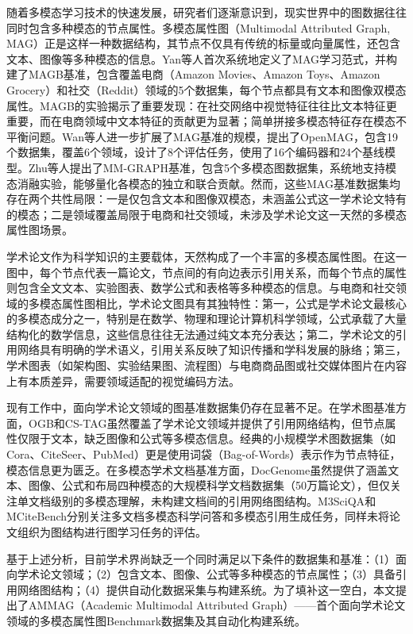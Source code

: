 随着多模态学习技术的快速发展\cite{baltruvsaitis2019multimodal}，研究者们逐渐意识到，现实世界中的图数据往往同时包含多种模态的节点属性。多模态属性图（Multimodal Attributed Graph, MAG）正是这样一种数据结构，其节点不仅具有传统的标量或向量属性，还包含文本、图像等多种模态的信息。Yan等人\cite{yan2025magb}首次系统地定义了MAG学习范式，并构建了MAGB基准，包含覆盖电商（Amazon Movies、Amazon Toys、Amazon Grocery）和社交（Reddit）领域的5个数据集，每个节点都具有文本和图像双模态属性。MAGB的实验揭示了重要发现：在社交网络中视觉特征往往比文本特征更重要，而在电商领域中文本特征的贡献更为显著；简单拼接多模态特征存在模态不平衡问题。Wan等人\cite{wan2026openmag}进一步扩展了MAG基准的规模，提出了OpenMAG，包含19个数据集，覆盖6个领域，设计了8个评估任务，使用了16个编码器和24个基线模型。Zhu等人\cite{zhu2025mmgraph}提出了MM-GRAPH基准，包含5个多模态图数据集，系统地支持模态消融实验，能够量化各模态的独立和联合贡献。然而，这些MAG基准数据集均存在两个共性局限：一是仅包含文本和图像双模态，未涵盖公式这一学术论文特有的模态；二是领域覆盖局限于电商和社交领域，未涉及学术论文这一天然的多模态属性图场景。

学术论文作为科学知识的主要载体，天然构成了一个丰富的多模态属性图。在这一图中，每个节点代表一篇论文，节点间的有向边表示引用关系，而每个节点的属性则包含全文文本、实验图表、数学公式和表格等多种模态的信息。与电商和社交领域的多模态属性图相比，学术论文图具有其独特性：第一，公式是学术论文最核心的多模态成分之一，特别是在数学、物理和理论计算机科学领域，公式承载了大量结构化的数学信息，这些信息往往无法通过纯文本充分表达；第二，学术论文的引用网络具有明确的学术语义，引用关系反映了知识传播和学科发展的脉络；第三，学术图表（如架构图、实验结果图、流程图）与电商商品图或社交媒体图片在内容上有本质差异，需要领域适配的视觉编码方法。

现有工作中，面向学术论文领域的图基准数据集仍存在显著不足。在学术图基准方面，OGB\cite{hu2020ogb}和CS-TAG\cite{yan2023cstag}虽然覆盖了学术论文领域并提供了引用网络结构，但节点属性仅限于文本，缺乏图像和公式等多模态信息。经典的小规模学术图数据集（如Cora、CiteSeer、PubMed\cite{sen2008collective}）更是使用词袋（Bag-of-Words）表示作为节点特征，模态信息更为匮乏。在多模态学术文档基准方面，DocGenome\cite{xia2024docgenome}虽然提供了涵盖文本、图像、公式和布局四种模态的大规模科学文档数据集（50万篇论文），但仅关注单文档级别的多模态理解，未构建文档间的引用网络图结构。M3SciQA\cite{li2024m3sciqa}和MCiteBench\cite{hu2025mcitebench}分别关注多文档多模态科学问答和多模态引用生成任务，同样未将论文组织为图结构进行图学习任务的评估。

基于上述分析，目前学术界尚缺乏一个同时满足以下条件的数据集和基准：（1）面向学术论文领域；（2）包含文本、图像、公式等多种模态的节点属性；（3）具备引用网络图结构；（4）提供自动化数据采集与构建系统。为了填补这一空白，本文提出了AMMAG（Academic Multimodal Attributed Graph）——首个面向学术论文领域的多模态属性图Benchmark数据集及其自动化构建系统。

